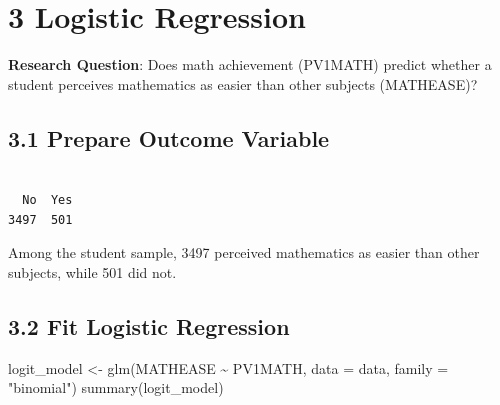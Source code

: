 \documentclass[
  letterpaper,
  DIV=11,
  numbers=noendperiod]{scrreprt}
\newenvironment{Shaded}{\begin{snugshade}}{\end{snugshade}}
\newcommand{\AttributeTok}[1]{\textcolor[rgb]{0.40,0.45,0.13}{#1}}
\newcommand{\DecValTok}[1]{\textcolor[rgb]{0.68,0.00,0.00}{#1}}
\newcommand{\FunctionTok}[1]{\textcolor[rgb]{0.28,0.35,0.67}{#1}}
\newcommand{\NormalTok}[1]{\textcolor[rgb]{0.00,0.23,0.31}{#1}}
\newcommand{\OtherTok}[1]{\textcolor[rgb]{0.00,0.23,0.31}{#1}}
\newcommand{\SpecialCharTok}[1]{\textcolor[rgb]{0.37,0.37,0.37}{#1}}
\newcommand{\StringTok}[1]{\textcolor[rgb]{0.13,0.47,0.30}{#1}}
\begin{document}
\section*{3 Logistic Regression}\label{logistic-regression}


\textbf{Research Question}: Does math achievement (PV1MATH) predict
whether a student perceives mathematics as easier than other subjects
(MATHEASE)?

\subsection*{3.1 Prepare Outcome
Variable}\label{prepare-outcome-variable}

\begin{Shaded}
\end{Shaded}

\begin{verbatim}

  No  Yes 
3497  501 
\end{verbatim}

Among the student sample, 3497 perceived mathematics as easier than
other subjects, while 501 did not.

\subsection*{3.2 Fit Logistic Regression}\label{fit-logistic-regression}

\begin{Shaded}
\begin{Highlighting}[]
\NormalTok{logit\_model }\OtherTok{\textless{}{-}} \FunctionTok{glm}\NormalTok{(MATHEASE }\SpecialCharTok{\textasciitilde{}}\NormalTok{ PV1MATH, }\AttributeTok{data =}\NormalTok{ data, }\AttributeTok{family =} \StringTok{"binomial"}\NormalTok{) }
\FunctionTok{summary}\NormalTok{(logit\_model)  }
\end{Highlighting}
\end{Shaded}
\end{document}
